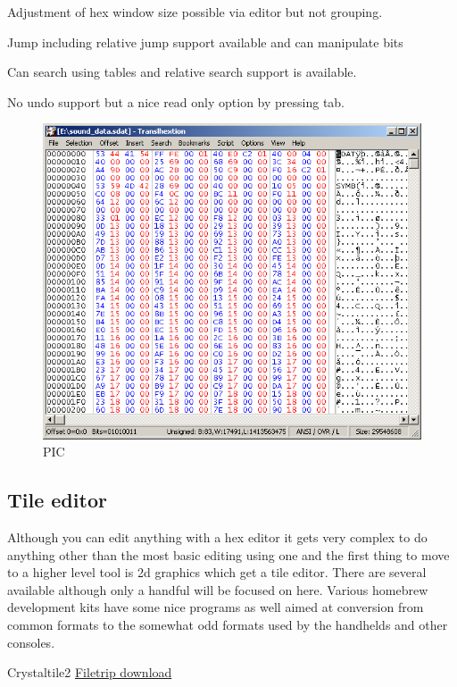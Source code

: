 \documentclass[
]{book}
\begin{document}
Adjustment of hex window size possible via editor but not grouping.

Jump including relative jump support available and can manipulate bits

Can search using tables and relative search support is available.

No undo support but a nice read only option by pressing tab.

\begin{figure}
\centering
\includegraphics{images/11_home_fast6191_romhackingguide_unrenamed_file___ackingguidehexeditorsshowcasetranslhextion1.png}
\caption{PIC}
\end{figure}

\hypertarget{tile-editor}{%
\subsection{Tile editor}\label{tile-editor}}

Although you can edit anything with a hex editor it gets very complex to do anything other than the most basic editing using one and the first thing to move to a higher level tool is 2d graphics which get a tile editor. There are several available although only a handful will be focused on here. Various homebrew development kits have some nice programs as well aimed at conversion from common formats to the somewhat odd formats used by the handhelds and other consoles.

Crystaltile2 \href{http://filetrip.net/f23649-CrystalTile2-2010-09-06.html}{Filetrip download}
\end{document}
